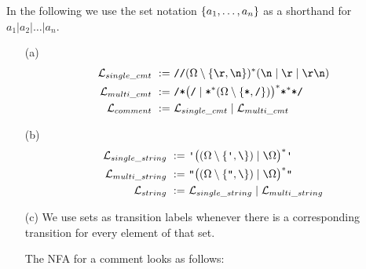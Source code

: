 \begin{solution}
In the following we use the set notation $\left\{ a_1,\ldots,a_n \right\}$ as a shorthand for $a_1 | a_2 | \ldots | a_n$.
\begin{enumerate}
  \item[(a)] \begin{align*}
      \mathcal{L}_{single\_cmt} ~:=~ & \texttt{//} (\Omega \setminus \left\{ \texttt{\textbackslash{}r}, \texttt{\textbackslash{}n} \right\})^\ast (\texttt{\textbackslash{}n} \mid \texttt{\textbackslash{}r} \mid \texttt{\textbackslash{}r\textbackslash{}n}) \\
      \mathcal{L}_{multi\_cmt}  ~:=~ & \texttt{/*} \big(\texttt{/} \mid \texttt{*}^\ast (\Omega \setminus \left\{ \texttt{*}, \texttt{/} \right\})\big)^\ast \texttt{*}^\ast \texttt{*/} \\
      \mathcal{L}_{comment}     ~:=~ & \mathcal{L}_{single\_cmt} \mid \mathcal{L}_{multi\_cmt}
    \end{align*}

  \item[(b)] \begin{align*}
      \mathcal{L}_{single\_string} ~:=~ & \texttt{\textquotesingle} \big( (\Omega \setminus \set{\texttt{\textquotesingle}, \texttt{\textbackslash{}}}) \mid \texttt{\textbackslash{}} \Omega \big)^\ast \texttt{\textquotesingle} \\
      \mathcal{L}_{multi\_string}  ~:=~ & \texttt{"} \big( (\Omega \setminus \set{\texttt{"}, \texttt{\textbackslash{}}}) \mid \texttt{\textbackslash{}} \Omega \big)^\ast \texttt{"} \\
      \mathcal{L}_{string}         ~:=~ & \mathcal{L}_{single\_string} \mid \mathcal{L}_{multi\_string}
    \end{align*}

  \item[(c)] We use sets as transition labels whenever there is a corresponding transition for every element of that set.

  The NFA for a comment looks as follows:
  \begin{center}
\end{center}
\end{enumerate}
\end{solution}
